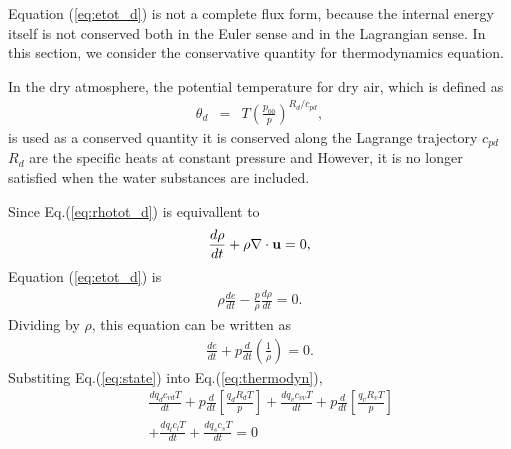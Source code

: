 Equation (\ref{eq:etot_d}) is not a complete flux form,
because the internal energy itself is not conserved
both in the Euler sense and in the Lagrangian sense.
In this section, we consider the conservative
quantity for thermodynamics equation.

In the dry atmosphere, the potential temperature for dry air,
which is defined as
\begin{eqnarray}
\theta_d &=& T \left(\frac{p_{00}}{p}\right)^{R_d/c_{pd}},
\end{eqnarray}
is used as a conserved quantity it is conserved along the Lagrange trajectory
$c_{pd}$ $R_d$ are the specific heats at constant pressure and
However, it is no longer satisfied when the water substances are included.

Since Eq.(\ref{eq:rhotot_d}) is equivallent to
\begin{eqnarray}
  \frac{d \rho}{dt}+\rho \nabla \cdot {\bf u} = 0,
\end{eqnarray}
Equation (\ref{eq:etot_d}) is
\begin{eqnarray}
  \rho \frac{de}{dt} - \frac{p}{\rho}\frac{d \rho}{dt} =0. \label{eq:etot_d2}
\end{eqnarray}
Dividing by $\rho$, this equation can be written as
\begin{eqnarray}
  \frac{de}{dt} + p \frac{d}{dt}\left(\frac{1}{\rho}\right) = 0.
\label{eq:thermodyn}
\end{eqnarray}
Substiting Eq.(\ref{eq:state}) into Eq.(\ref{eq:thermodyn}),
\begin{eqnarray}
&& \frac{d  q_d c_{vd}   T}{dt} + p \frac{d}{dt} \left[\frac{q_d R_d T}{p}\right]
+\frac{d  q_v c_{vv}   T}{dt} + p \frac{d}{dt} \left[\frac{q_v R_v T}{p}\right]
\nonumber\\
&&+\frac{d  q_l c_{l}   T}{dt}+\frac{d  q_s c_{s}   T}{dt} =0
\label{eq:thermodyn_dash}
\end{eqnarray}

